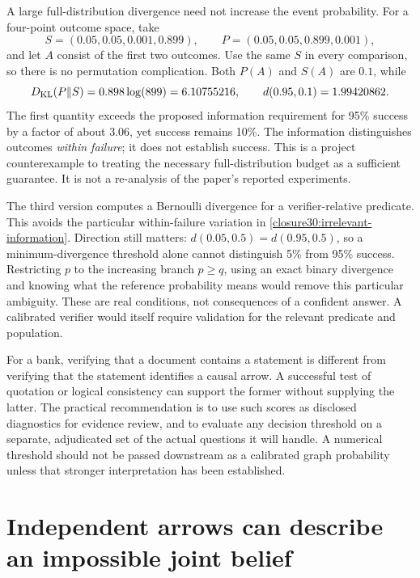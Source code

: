 A large full-distribution divergence need not increase the event probability.
For a four-point outcome space, take
\begin{equation}
 S=(0.05,0.05,0.001,0.899),\qquad
 P=(0.05,0.05,0.899,0.001),
 \label{closure30:irrelevant-information}
\end{equation}
and let $A$ consist of the first two outcomes. Use the same $S$ in every
comparison, so there is no permutation complication. Both $P(A)$ and $S(A)$
are $0.1$, while
\begin{equation}
 D_{\rm KL}(P\Vert S)=0.898\log(899)=6.10755216,
 \qquad d(0.95,0.1)=1.99420862.
 \label{closure30:budget-counterexample}
\end{equation}
The first quantity exceeds the proposed information requirement for 95\%
success by a factor of about 3.06, yet success remains 10\%. The information
distinguishes outcomes \emph{within failure}; it does not establish success.
This is a project counterexample to treating the necessary full-distribution
budget as a sufficient guarantee. It is not a re-analysis of the paper's
reported experiments.

The third version computes a Bernoulli divergence for a verifier-relative
predicate. This avoids the particular within-failure variation in
\eqref{closure30:irrelevant-information}. Direction still matters:
$d(0.05,0.5)=d(0.95,0.5)$, so a minimum-divergence threshold alone cannot
distinguish 5\% from 95\% success. Restricting $p$ to the increasing branch
$p\geq q$, using an exact binary divergence and knowing what the reference
probability means would remove this particular ambiguity. These are real
conditions, not consequences of a confident answer. A calibrated verifier
would itself require validation for the relevant predicate and population.
\citep[Sections 3.5--3.6, Algorithm 1 and Appendix A.5]
{closure30chlonthree}

For a bank, verifying that a document contains a statement is different from
verifying that the statement identifies a causal arrow. A successful test of
quotation or logical consistency can support the former without supplying
the latter. The practical recommendation is to use such scores as disclosed
diagnostics for evidence review, and to evaluate any decision threshold on a
separate, adjudicated set of the actual questions it will handle. A numerical
threshold should not be passed downstream as a calibrated graph probability
unless that stronger interpretation has been established.

\section{Independent arrows can describe an impossible joint belief}

